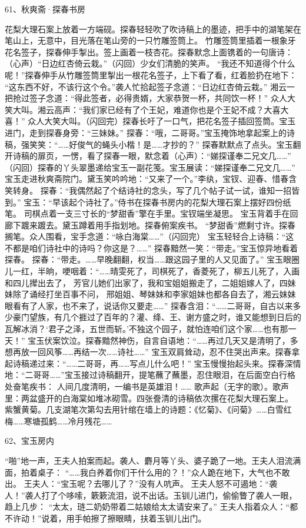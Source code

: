 61、秋爽斋·探春书房\par
花梨大理石案上放着一方端砚。探春轻轻吹了吹诗稿上的墨迹，把手中的湖笔架在笔山上，无意中，目光落在笔山旁的一只竹雕签筒上。
竹雕签筒里插着一根象牙花名签子，探春伸手掣出。签上画着一枝杏花。探春默念上面镌着的一句唐诗：
（心声）“日边红杏倚云栽。”（闪回）少女们清脆的笑声。
“我还不知道得个什么呢！”探春伸手从竹雕签筒里掣出一根花名签子，上下看了看，红着脸扔在地下：
“这东西不好，不该行这个令。”袭人忙拾起签子念道：“日边红杏倚云栽。”
湘云一把抢过签子念道：“得此签者，必得贵婿，大家恭贺一杯，共同饮一杯！”
众人大笑大叫。湘云高声：“我们家已经有了个王妃，难道你也是个王妃不成？大喜大喜！”
众人大笑大叫。（闪回完）探春长吁了一口气，把花名签子插回签筒。宝玉进门，走到探春身旁：“三妹妹。”
探春：“哦，二哥哥。”宝玉掩饰地拿起案上的诗稿，强笑笑：“……好俊气的蝇头小楷！是……才抄的？”
探春默默点了点头。宝玉翻开诗稿的扉页，一愣，看了探春一眼，默念着（心声）：“娣探谨奉二兄文几……”
（闪回）探春的丫头翠墨递给宝玉一副花笺。宝玉展读：“娣探谨奉二兄文几……”
宝玉走进秋爽斋院门。黛玉笑吟吟地：“又来了一个。”李纨，宝钗、迎春、惜春含笑转身。
探春：“我偶然起了个结诗社的念头，写了几个帖子试一试，谁知一招皆到。”
宝玉：“早该起个诗社了。”侍书在探春书房内的花梨大理石案上摆好四份纸笔。
司棋点着一支三寸长的“梦甜香”擎在手里。宝钗端坐凝思。
宝玉背着手在回廊下踱来踱去。黛玉蹲着用手指划地。探春俯案疾书。
“梦甜香”燃剩寸许。探春搁笔。众人围看，宝手念道：“咏白海棠……”（闪回完）
宝玉轻轻合上诗稿：“这不都是咱们诗社中的诗吗？你这是？……”
探春黯然一笑：“带走。”宝玉惊异地看着探春。
探春：“带走。……早晚翻翻，权当……跟这园子里的人又见面了。”
宝玉眼圈儿一红，半晌，哽咽着：“……晴雯死了，司棋死了，香菱死了，柳五儿死了，入画和四儿撵出去了，
芳官儿她们出家了，我和宝姐姐搬走了，二姐姐嫁人了，四妹妹除了诵经打坐百事不问，
邢姐姐、琴妹妹和李家姐妹也都各自去了，湘云妹妹眼看有了人家，也不来了，说话你又要走……”
探春含泪：“……二哥哥，自古以来多少豪门望族，有几个捱过了百年的？灌、绛、王、谢方盛之时，谁又能想到日后的瓦解冰消？‘君子之泽，五世而斩。’不独这个园子，就怕连咱们这个家……也有那一天！”
宝玉伏案饮泣。探春黯然神伤，自言自语地：“……再过几天又是清明了，多想再放一回风筝……再结一次……诗社……”
宝玉双肩耸动，忍不住哭出声来。探春拿起诗稿递过来：“……二哥哥，再……写点儿什么吧！”
宝玉慢慢抬起头来。探春深情地：“二哥哥……”宝玉接过诗稿翻开，提笔蘸了蘸墨，忍住眼泪，在后面空白行格处奋笔疾书：
人间几度清明，一编书是英雄泪！……
歌声起（无字的歌）。歌声里：两盆盛开的白海棠如堆冰砌雪。四张誊清的诗稿依次摞在花梨大理石案上。
紫蟹黄菊。几支湖笔次第勾去用针绾在墙上的诗题：《忆菊》、《问菊》……白雪红梅……寒塘孤鹤……冷月残花……

62、宝玉房内\par
“啪”地一声，王夫人拍案而起。袭人、麝月等丫头、婆子跪了一地。王夫人泪流满面，拍着桌子：
“……我白养着你们干什么用的？！”众人跪在地下，大气也不敢出。
王夫人：“宝玉呢？去哪儿了？”没有人吭声。
王夫人怒不可遏地：“袭人！”袭人打了个哆嗦，簌簌流泪，说不出话。玉钏儿进门，偷偷瞥了袭人一眼，趋上几步：
“太太，琏二奶奶带着二姑娘给太太请安来了。”
王夫人指着众人：“都不许动！”说着，用手帕擦了擦眼睛，扶着玉钏儿出门。

